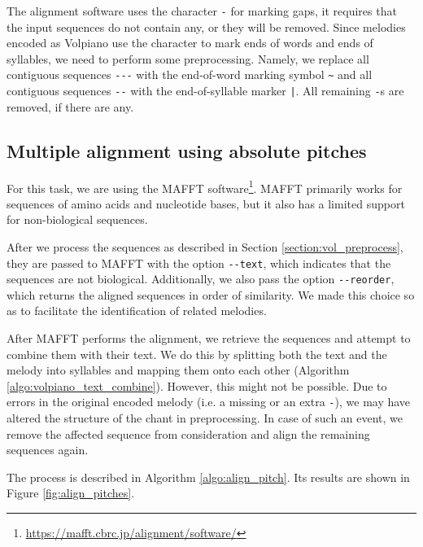 The alignment software uses the character \verb|-| for marking gaps,
it requires that the input sequences do not contain any, or they will be removed. Since melodies encoded as Volpiano use the character to mark ends of words
and ends of syllables, we need to perform some preprocessing. Namely, we replace all contiguous sequences \verb|---| with the end-of-word marking symbol \verb|~|
and all contiguous sequences \verb|--| with the end-of-syllable marker \verb=|=. All remaining \verb|-|s are removed, if there are any.

\subsection{Multiple alignment using absolute pitches}

For this task, we are using the MAFFT software\footnote{\url{https://mafft.cbrc.jp/alignment/software/}}.
MAFFT primarily works for sequences of amino acids and nucleotide bases, but it also has a limited support for non-biological sequences.

After we process the sequences as described in Section \ref{section:vol_preprocess}, they are passed to MAFFT with the option \verb|--text|, which
indicates that the sequences are not biological. Additionally, we also pass the option \verb|--reorder|, which returns the aligned sequences in order 
of similarity. We made this choice so as to facilitate the identification of related melodies.

After MAFFT performs the alignment, we retrieve the sequences and attempt to combine them with their text.
We do this by splitting both the text and the melody into syllables and mapping them onto each other (Algorithm \ref{algo:volpiano_text_combine}). 
However, this might not be possible. Due to errors in the original encoded melody (i.e. a missing or an extra \verb|-|),
we may have altered the structure of the chant in preprocessing. In case of such an event, we remove the affected sequence from consideration and align the remaining
sequences again.

The process is described in Algorithm \ref{algo:align_pitch}. Its results are shown in Figure \ref{fig:align_pitches}.\newline

